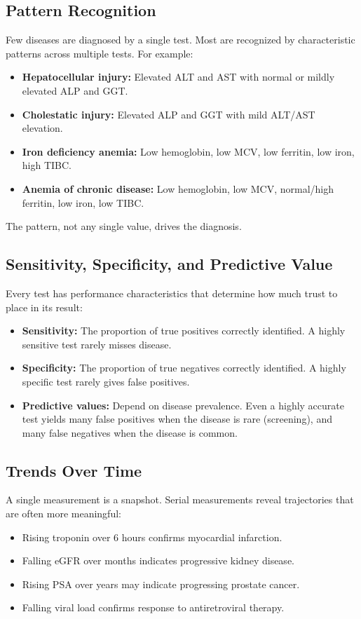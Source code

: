 \subsection{Pattern Recognition}

Few diseases are diagnosed by a single test. Most are recognized by characteristic patterns across multiple tests. For example:
\begin{itemize}
    \item \textbf{Hepatocellular injury:} Elevated ALT and AST with normal or mildly elevated ALP and GGT.
    \item \textbf{Cholestatic injury:} Elevated ALP and GGT with mild ALT/AST elevation.
    \item \textbf{Iron deficiency anemia:} Low hemoglobin, low MCV, low ferritin, low iron, high TIBC.
    \item \textbf{Anemia of chronic disease:} Low hemoglobin, low MCV, normal/high ferritin, low iron, low TIBC.
\end{itemize}
The pattern, not any single value, drives the diagnosis.

\subsection{Sensitivity, Specificity, and Predictive Value}

Every test has performance characteristics that determine how much trust to place in its result:
\begin{itemize}
    \item \textbf{Sensitivity:} The proportion of true positives correctly identified. A highly sensitive test rarely misses disease.
    \item \textbf{Specificity:} The proportion of true negatives correctly identified. A highly specific test rarely gives false positives.
    \item \textbf{Predictive values:} Depend on disease prevalence. Even a highly accurate test yields many false positives when the disease is rare (screening), and many false negatives when the disease is common.
\end{itemize}

\subsection{Trends Over Time}

A single measurement is a snapshot. Serial measurements reveal trajectories that are often more meaningful:
\begin{itemize}
    \item Rising troponin over 6 hours confirms myocardial infarction.
    \item Falling eGFR over months indicates progressive kidney disease.
    \item Rising PSA over years may indicate progressing prostate cancer.
    \item Falling viral load confirms response to antiretroviral therapy.
\end{itemize}

